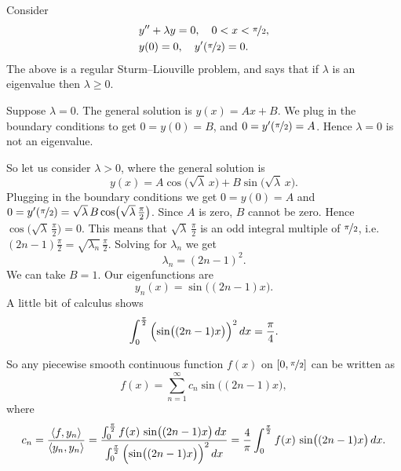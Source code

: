 \begin{example}
Consider
\begin{align*}
& y'' + \lambda y = 0, \quad 0 < x < \nicefrac{\pi}{2} , \\
& y(0) =0, \quad y'(\nicefrac{\pi}{2}) = 0 .
\end{align*}
The above is a regular Sturm--Liouville problem, and
says that if $\lambda$ is an eigenvalue then
$\lambda \geq 0$.

Suppose $\lambda = 0$.  The general solution is $y(x) = Ax + B$.
We plug in the
boundary conditions to get $0=y(0) = B$, and $0 = y'(\nicefrac{\pi}{2}) = A$.
Hence $\lambda = 0$ is not an eigenvalue.

So let us consider $\lambda > 0$, where
the general solution is
\begin{equation*}
y(x) = A \cos \bigl( \sqrt{\lambda} \, x \bigr)
+ B \sin \bigl( \sqrt{\lambda} \, x \bigr) .
\end{equation*}
Plugging in the boundary conditions we get
$0 = y(0) = A$ and $0 = y'(\nicefrac{\pi}{2})
= \sqrt{\lambda} \, B \cos \bigl(\sqrt{\lambda} \, \frac{\pi}{2}\bigr)$.
Since $A$ is zero,
$B$ cannot be zero.  Hence $\cos \bigl( \sqrt{\lambda} \,
\frac{\pi}{2}\bigr) = 0$.
This means that
$\sqrt{\lambda} \,\frac{\pi}{2}$ is an odd integral multiple of
$\nicefrac{\pi}{2}$,
i.e.\ $(2n-1)\frac{\pi}{2} = \sqrt{\lambda_n} \,\frac{\pi}{2}$.
Solving for $\lambda_n$ we get
\begin{equation*}
\lambda_n = {(2n-1)}^2 .
\end{equation*}
We can take $B = 1$.  Our eigenfunctions are
\begin{equation*}
y_n(x) = \sin \bigl( (2n-1)x \bigr) .
\end{equation*}
A little bit of calculus shows
\begin{equation*}
\int_0^{\frac{\pi}{2}} {\Bigl( \sin \bigl( (2n-1)x \bigr) \Bigr)}^2 \, dx
= \frac{\pi}{4} .
\end{equation*}

So any piecewise smooth continuous function $f(x)$ on $[0,\nicefrac{\pi}{2}]$ can be written as
\begin{equation*}
f(x) = \sum_{n=1}^\infty c_n \sin \bigl( (2n-1)x \bigr) ,
\end{equation*}
where
\begin{equation*}
c_n = \frac{\langle f , y_n \rangle}{\langle y_n , y_n \rangle}
= \frac{\int_0^{\frac{\pi}{2}} f(x) \, \sin \bigl( (2n-1)x \bigr) \, dx
}{\int_0^{\frac{\pi}{2}} {\Bigl(\sin \bigl((2n-1)x\bigr)\Bigr)}^2 \, dx}
= \frac{4}{\pi} \int_0^{\frac{\pi}{2}} f(x) \,\sin \bigl( (2n-1)x \bigr) \, dx .
\end{equation*}


\end{example}
